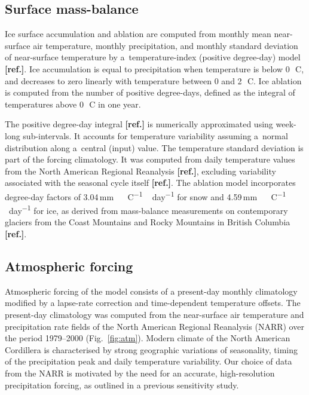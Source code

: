 \documentclass[tc, ms]{copernicus}
\newcommand{\aref}[0]{\textbf{[ref.]}}
\renewcommand{\citep}[1]{\aref}
\renewcommand{\citet}[1]{\aref}
\begin{document}
\subsection{Surface mass-balance}

Ice surface accumulation and ablation are computed from monthly mean
near-surface air temperature, monthly precipitation, and monthly standard
deviation of near-surface temperature by a~temperature-index (positive
degree-day) model \citep{hock-2003}. Ice accumulation is equal to precipitation
when temperature is below 0\,\unit{{\degree}C}, and decreases to zero linearly
with temperature between 0 and 2\,\unit{{\degree}C}. Ice ablation is computed
from the number of positive degree-days, defined as the integral of
temperatures above 0\,\unit{{\degree}C} in one year.

The positive degree-day integral \citep{calov-greve-2005} is numerically
approximated using week-long sub-intervals. It accounts for temperature
variability assuming a~normal distribution along a~central (input) value. The
temperature standard deviation is part of the forcing climatology. It was
computed from daily temperature values from the North American Regional
Reanalysis \citep{data:narr}, excluding variability associated with the
seasonal cycle itself \citet{seguinot-rogozhina-2014}. The
ablation model incorporates degree-day factors of
3.04\,\unit{mm\,{\degree}C^{-1}\,day^{-1}} for snow and
4.59\,\unit{mm\,{\degree}C^{-1}\,day^{-1}} for ice, as derived from
mass-balance measurements on contemporary glaciers from the Coast Mountains and
Rocky Mountains in British Columbia \citep{shea-etal-2009}.

\subsection{Atmospheric forcing}

Atmospheric forcing of the model consists of a present-day monthly climatology
modified by a lapse-rate correction and time-dependent temperature offsets. The
present-day climatology was computed from the near-surface air temperature and
precipitation rate fields of the North American Regional Reanalysis (NARR) over
the period 1979--2000 (Fig.~\ref{fig:atm}). Modern climate of the North
American Cordillera is characterised by strong geographic variations of
seasonality, timing of the precipitation peak and daily temperature variability.
Our choice of data from the NARR is motivated by the need for an accurate,
high-resolution precipitation forcing, as outlined in a previous sensitivity
study.
\end{document}
